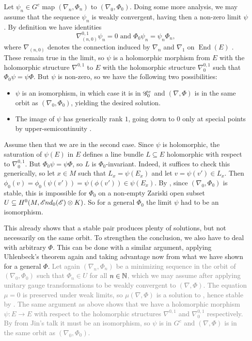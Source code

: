 \documentclass[A4paper, 12pt, british, reqno]{amsart}
\DeclareMathOperator{\End}{End}
\newcommand{\ot}{\otimes}
\newcommand{\1}{\mathbbm{1}}
\begin{document}
Let $\psi_{n}\in G^{c}$ map $(\nabla_{n},\Phi_{n})$ to $(\nabla_{0},\Phi_{0})$.
Doing some more analysis, we may assume that the sequence $\psi_{n}$ is weakly convergent, having then a non-zero limit $\psi$ \cite[p.~82]{hit87a}.
By definition we have identities
\[ \nabla_{(n,0)}^{0,1}\psi_{n}=0 \text{ and } \Phi_{0}\psi_{n}=\psi_{n}\Phi_{n}, \]
where $\nabla_{(n,0)}$ denotes the connection induced by $\nabla_{n}$ and $\nabla_{1}$ on $\End(E)$ \cite[Example 4.2.6 iii)]{huy05}.
These remain true in the limit, so $\psi$ is a holomorphic morphism from $E$ with the holomorphic structure $\nabla^{0,1}$ to $E$ with the holomorphic structure $\nabla^{0,1}_{0}$ such that $\Phi_{0}\psi=\psi\Phi$.
But $\psi$ is non-zero, so we have the following two possibilities:
\begin{itemize}
    \item $\psi$ is an isomorphism, in which case it is in $\mathscr{G}^{c}_{0}$ and $(\nabla,\Phi)$ is in the same orbit as $(\nabla_{0},\Phi_{0})$, yielding the desired solution.
    \item The image of $\psi$ has generically rank $1$, going down to $0$ only at special points by upper-semicontinuity \cite[Proposition 1.3.2]{ati89}.
\end{itemize}

Assume then that we are in the second case.
Since $\psi$ is holomorphic, the saturation of $\psi(E)$ in $E$ defines a line bundle $L\subseteq E$ holomorphic with respect to $\nabla_{0}^{0,1}$.
But $\Phi_{0}\psi=\psi\Phi$, so $L$ is $\Phi_{0}$-invariant.
Indeed, it suffices to check this generically, so let $x\in M$ such that $L_{x}=\psi(E_{x})$ and let $v=\psi(v')\in L_{x}$.
Then $\phi_{0}(v)=\phi_{0}(\psi(v'))=\psi(\phi(v'))\in \psi(E_{x})$.
By , since $(\nabla_{0},\Phi_{0})$ is stable, this is impossible for $\Phi_{0}$ on a non-empty Zariski open subset $U\subseteq H^{0}(M,\sEnd_{0}(\E)\ot K)$.
So for a general $\Phi_{0}$ the limit $\psi$ had to be an isomorphism.

This already shows that a stable pair produces plenty of solutions, but not necessarily on the same orbit.
To strengthen the conclusion, we also have to deal with arbitrary $\Phi$.
This can be done with a similar argument, applying Uhlenbeck's theorem again and taking advantage now from what we have shown for a general $\Phi$.
\textcolor{gray}{%
Let again $(\nabla_{n},\Phi_{n})$ be a minimizing sequence in the orbit of $(\nabla_{0},\Phi_{0})$ such that $\Phi_{n}\in U$ for all $n\in \mathbb{N}$, which we may assume after applying unitary gauge transformations to be weakly convergent to $(\nabla,\Phi)$.
The equation $\mu=0$ is preserved under weak limits, so $\mu(\nabla,\Phi)$ is a solution to , hence stable by \cite[(2.1]{hit87a}.
The same argument as above shows that we have a holomorphic morphism $\psi\colon E\to E$ with respect to the holomorphic structures $\nabla^{0,1}$ and $\nabla_{0}^{0,1}$ respectively.
By \cite[(3.15)]{hit87a} from Jin's talk it must be an isomorphism, so $\psi$ is in $G^{c}$ and $(\nabla,\Phi)$ is in the same orbit as $(\nabla_{0},\Phi_{0})$.
}
\end{document}
